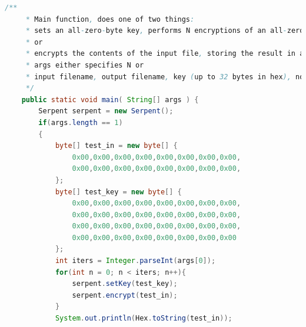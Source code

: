 \documentclass[12pt]{article} %
\begin{document}
\begin{lstlisting}[language=Java, basicstyle=\small, breaklines=true]
    /**
     * Main function, does one of two things:
     * sets an all-zero-byte key, performs N encryptions of an all-zero-byte plaintext block
     * or 
     * encrypts the contents of the input file, storing the result in an output file
     * args either specifies N or 
     * input filename, output filename, key (up to 32 bytes in hex), nonce (integer), and [e]ncrypt or [d]ecrypt
     */
    public static void main( String[] args ) {
        Serpent serpent = new Serpent();
        if(args.length == 1)
        {
            byte[] test_in = new byte[] {
                0x00,0x00,0x00,0x00,0x00,0x00,0x00,0x00,
                0x00,0x00,0x00,0x00,0x00,0x00,0x00,0x00,
            };
            byte[] test_key = new byte[] {
                0x00,0x00,0x00,0x00,0x00,0x00,0x00,0x00,
                0x00,0x00,0x00,0x00,0x00,0x00,0x00,0x00,
                0x00,0x00,0x00,0x00,0x00,0x00,0x00,0x00,
                0x00,0x00,0x00,0x00,0x00,0x00,0x00,0x00
            };
            int iters = Integer.parseInt(args[0]);
            for(int n = 0; n < iters; n++){
                serpent.setKey(test_key);
                serpent.encrypt(test_in);
            }
            System.out.println(Hex.toString(test_in));
            

\end{lstlisting}
\end{document}
